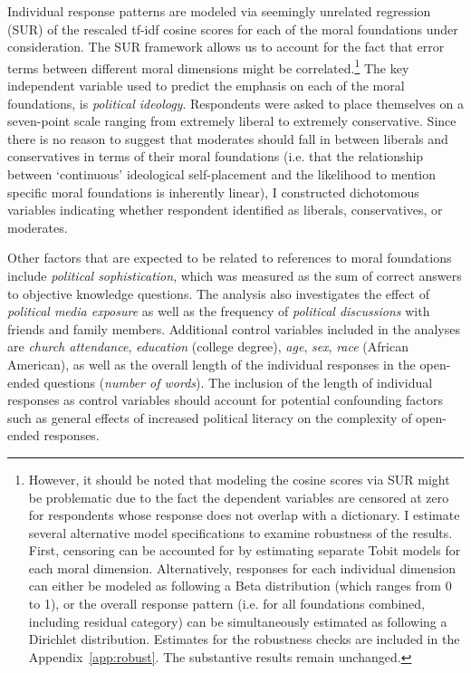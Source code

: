 \documentclass[12pt]{article}
\begin{document}
Individual response patterns are modeled via seemingly unrelated regression (SUR) of the rescaled tf-idf cosine scores for each of the moral foundations under consideration. The SUR framework allows us to account for the fact that error terms between different moral dimensions might be correlated.\footnote{However, it should be noted that modeling the cosine scores via SUR might be problematic due to the fact the dependent variables are censored at zero for respondents whose response does not overlap with a dictionary. I estimate several alternative model specifications to examine robustness of the results. First, censoring can be accounted for by estimating separate Tobit models for each moral dimension. Alternatively, responses for each individual dimension can either be modeled as following a Beta distribution (which ranges from 0 to 1), or the overall response pattern (i.e. for all foundations combined, including residual category) can be simultaneously estimated as following a Dirichlet distribution. Estimates for the robustness checks are included in the Appendix~\ref{app:robust}. The substantive results remain unchanged.} The key independent variable used to predict the emphasis on each of the moral foundations, is \textit{political ideology}. Respondents were asked to place themselves on a seven-point scale ranging from extremely liberal to extremely conservative. Since there is no reason to suggest that moderates should fall in between liberals and conservatives in terms of their moral foundations (i.e. that the relationship between `continuous' ideological self-placement and the likelihood to mention specific moral foundations is inherently linear), I constructed dichotomous variables indicating whether respondent identified as liberals, conservatives, or moderates.

Other factors that are expected to be related to references to moral foundations include \textit{political sophistication}, which was measured as the sum of correct answers to objective knowledge questions. The analysis also investigates the effect of \textit{political media exposure} as well as the frequency of \textit{political discussions} with friends and family members. Additional control variables included in the analyses are \textit{church attendance}, \textit{education} (college degree), \textit{age}, \textit{sex}, \textit{race} (African American), as well as the overall length of the individual responses in the open-ended questions (\textit{number of words}). The inclusion of the length of individual responses as control variables should account for potential confounding factors such as general effects of increased political literacy on the complexity of open-ended responses.
\end{document}
